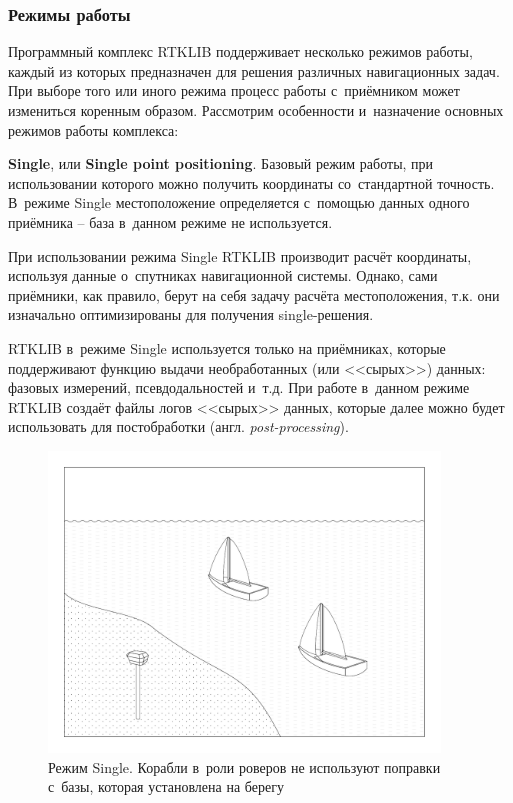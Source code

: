 \subsubsection{Режимы работы}

Программный комплекс RTKLIB поддерживает несколько режимов работы, каждый из которых предназначен для решения различных навигационных задач. При выборе того или иного режима процесс работы с~приёмником может измениться коренным образом. Рассмотрим особенности и~назначение основных режимов работы комплекса:

\begin{dashitemize}
  \item \textbf{Single}, или \textbf{Single point positioning}. Базовый режим работы, при использовании которого можно получить координаты со~стандартной точность. В~режиме Single местоположение определяется с~помощью данных одного приёмника -- база в~данном режиме не используется. \par
  При использовании режима Single RTKLIB производит расчёт координаты, используя данные о~спутниках навигационной системы. Однако, сами приёмники, как правило, берут на себя задачу расчёта местоположения, т.к. они изначально оптимизированы для получения single-решения. \par
  RTKLIB в~режиме Single используется только на приёмниках, которые поддерживают функцию выдачи необработанных (или <<сырых>>) данных: фазовых измерений, псевдодальностей и~т.д. При работе в~данном режиме RTKLIB создаёт файлы логов <<сырых>> данных, которые далее можно будет использовать для постобработки (англ. \emph{post-processing}).
  \begin{figure}[h!]
    \centering
    \setlength{\fboxsep}{5pt}
    \includegraphics[height=8cm]{img/tikz/rtk-single/pic}
    \caption{Режим Single. Корабли в~роли роверов не используют поправки с~базы, которая установлена на берегу}

\end{figure}
\end{dashitemize}
